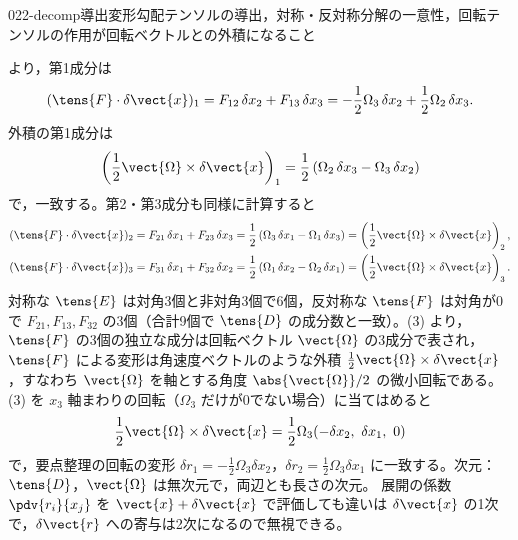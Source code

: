 \documentclass[uplatex,dvipdfmx,a4paper,11pt]{jsarticle}
\begin{document}
\begin{mondai}{022-decomp}{導出}{変形勾配テンソルの導出，対称・反対称分解の一意性，回転テンソルの作用が回転ベクトルとの外積になること}
\begin{tadashii}
  より，第1成分は
\[ (\tens{F}\cdot\delta\vect{x})_1=F_{12}\,\delta x_2+F_{13}\,\delta x_3=-\frac{1}{2}\Omega_3\,\delta x_2+\frac{1}{2}\Omega_2\,\delta x_3. \]
外積の第1成分は
\[ \left(\frac{1}{2}\vect{\Omega}\times\delta\vect{x}\right)_1=\frac{1}{2}\left(\Omega_2\,\delta x_3-\Omega_3\,\delta x_2\right) \]
で，一致する。第2・第3成分も同様に計算すると
\begin{align*}
(\tens{F}\cdot\delta\vect{x})_2&=F_{21}\,\delta x_1+F_{23}\,\delta x_3=\frac{1}{2}\left(\Omega_3\,\delta x_1-\Omega_1\,\delta x_3\right)=\left(\frac{1}{2}\vect{\Omega}\times\delta\vect{x}\right)_2,\\
(\tens{F}\cdot\delta\vect{x})_3&=F_{31}\,\delta x_1+F_{32}\,\delta x_2=\frac{1}{2}\left(\Omega_1\,\delta x_2-\Omega_2\,\delta x_1\right)=\left(\frac{1}{2}\vect{\Omega}\times\delta\vect{x}\right)_3.
\end{align*}
 対称な $\tens{E}$ は対角3個と非対角3個で6個，反対称な $\tens{F}$ は対角が0で $F_{21},F_{13},F_{32}$ の3個（合計9個で $\tens{D}$ の成分数と一致）。(3) より，$\tens{F}$ の3個の独立な成分は回転ベクトル $\vect{\Omega}$ の3成分で表され，$\tens{F}$ による変形は角速度ベクトルのような外積 $\frac{1}{2}\vect{\Omega}\times\delta\vect{x}$，すなわち $\vect{\Omega}$ を軸とする角度 $\abs{\vect{\Omega}}/2$ の微小回転である。
\kenzan (3) を $x_3$ 軸まわりの回転（$\Omega_3$ だけが0でない場合）に当てはめると
\[ \frac{1}{2}\vect{\Omega}\times\delta\vect{x}=\frac{1}{2}\Omega_3(-\delta x_2,\ \delta x_1,\ 0) \]
で，要点整理の回転の変形 $\delta r_1=-\frac{1}{2}\Omega_3\delta x_2$，$\delta r_2=\frac{1}{2}\Omega_3\delta x_1$ に一致する。次元：$\tens{D}$，$\vect{\Omega}$ は無次元で，両辺とも長さの次元。
\tsumazuki 展開の係数 $\pdv{r_i}{x_j}$ を $\vect{x}+\delta\vect{x}$ で評価しても違いは $\delta\vect{x}$ の1次で，$\delta\vect{r}$ への寄与は2次になるので無視できる。
\end{tadashii}
\end{mondai}
\end{document}

